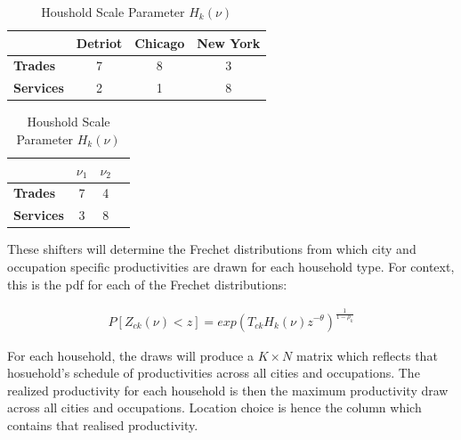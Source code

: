 \documentclass[10pt]{article}
\begin{document}
\vspace{2em}

\begin{table}[h]
    \begin{minipage}{0.5\textwidth}
        \centering
        \begin{tabular}{|l|c|c|c|}
            \hline
                              & \textbf{Detriot} & \textbf{Chicago} & \textbf{New York} \\
            \hline
            \textbf{Trades}   & 7                & 8                & 3                 \\
            \hline
            \textbf{Services} & 2                & 1                & 8                 \\
            \hline
        \end{tabular}
        \caption{City Scale Parameters $T_{ck}^{\star}$}
        \label{city_shifter}
    \end{minipage}%
    \begin{minipage}{0.5\textwidth}
        \centering
        \begin{tabular}{|l|c|c|c|}
            \hline
                              & \textbf{$\nu_1$} & \textbf{$\nu_2$} \\
            \hline
            \textbf{Trades}   & 7                & 4                \\
            \hline
            \textbf{Services} & 3                & 8                \\
            \hline
        \end{tabular}
        \caption{Houshold Scale Parameter $H_k(\nu)$}
        \label{household_shifter}
    \end{minipage}
\end{table}

\vspace{2em}

These shifters will determine the Frechet distributions from which city and occupation specific productivities are drawn for each household type. For context, this is the pdf for each of the Frechet distributions:

\begin{align}
    P[Z_{ck}(\nu) < z] = exp(T_{ck} H_k(\nu) z^{-\theta})^{\frac{1}{1 - \rho_k}}
\end{align}

For each household, the draws will produce a $K \times N$ matrix which reflects that hosuehold's schedule of productivities across all cities and occupations. The realized productivity for each household is then the maximum productivity draw across all cities and occupations. Location choice is hence the column which contains that realised productivity.
\end{document}
